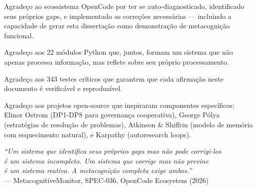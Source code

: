 \documentclass[12pt,a4paper,oneside]{abntex2}
\begin{document}
\begin{agradecimentos}
Agradeço ao ecossistema OpenCode por ter se auto-diagnosticado, identificado seus próprios gaps, e implementado as correções necessárias — incluindo a capacidade de gerar esta dissertação como demonstração de metacognição funcional.

Agradeço aos 22 módulos Python que, juntos, formam um sistema que não apenas processa informação, mas reflete sobre seu próprio processamento.

Agradeço aos 343 testes críticos que garantem que cada afirmação neste documento é verificável e reproduzível.

Agradeço aos projetos open-source que inspiraram componentes específicos: Elinor Ostrom (DP1-DP8 para governança cooperativa), George Pólya (estratégias de resolução de problemas), Atkinson \& Shiffrin (modelo de memória com esquecimento natural), e Karpathy (autoresearch loops).
\end{agradecimentos}

\begin{epigrafe}
    \vspace*{8cm}
    \begin{flushright}
    \textit{``Um sistema que identifica seus próprios gaps mas não pode corrigi-los\\é um sistema incompleto. Um sistema que corrige mas não previne\\é um sistema reativo. A metacognição completa exige ambos.''}\\
    \medskip
    --- MetacognitiveMonitor, SPEC-036, OpenCode Ecosystem (2026)
    \end{flushright}
\end{epigrafe}
\end{document}
